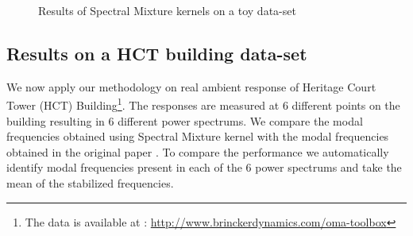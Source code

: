 \begin{figure}[!ht]
  \centering
  \quad
    \quad
  
  \caption{Results of Spectral Mixture kernels on a toy data-set}
\end{figure}

\subsection{Results on a HCT building data-set}
We now apply our methodology on real ambient response of Heritage Court Tower (HCT) Building\footnote{The data is available at : \url{http://www.brinckerdynamics.com/oma-toolbox}}. The responses are measured at 6 different points on the building resulting in 6 different power spectrums. We compare the modal frequencies obtained using Spectral Mixture kernel with the modal frequencies obtained in the original paper \cite{brincker2000modal}. To compare the performance we automatically identify modal frequencies present in each of the 6 power spectrums and take the mean of the stabilized frequencies.


